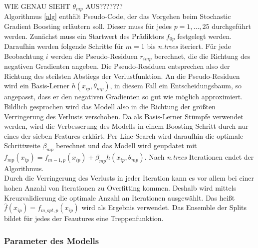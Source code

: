 WIE GENAU SIEHT $\theta_{mp}$ AUS???????\\
Algorithmus \ref{alg} enthält Pseudo-Code, der das Vorgehen beim Stochastic Gradient Boosting erläutern soll. Dieser muss für jedes $p=1,...,25$ durchgeführt werden. Zunächst muss ein Startwert des Prädiktors $f_{0p}$ festgelegt werden. Daraufhin werden folgende Schritte für $m=1$ bis \textit{n.trees} iteriert. Für jede Beobachtung $i$ werden die Pseudo-Residuen $r_{imp}$ berechnet, die die Richtung des negativen Gradienten angeben. Die Pseudo-Residuen entsprechen also der Richtung des steilsten Abstiegs der Verlustfunktion. An die Pseudo-Residuen wird ein Basis-Lerner $h(x_{ip},\theta_{mp})$, in diesem Fall ein Entscheidungsbaum, so angepasst, dass er den negativen Gradienten so gut wie möglich approximiert. Bildlich gesprochen wird das Modell also in die Richtung der größten Verringerung des Verlusts verschoben. Da als Basis-Lerner Stümpfe verwendet werden, wird die Verbesserung des Modells in einem Boosting-Schritt durch nur eines der sieben Features erklärt. Per Line-Search wird daraufhin die optimale Schrittweite $\beta_{mp}$ berechnet und das Modell wird geupdatet mit $f_{mp}(x_{ip}) = f_{m-1,p}(x_{ip}) + \beta_{mp} h(x_{ip},\theta_{mp})$. Nach \textit{n.trees} Iterationen endet der Algorithmus.\\
Durch die Verringerung des Verlusts in jeder Iteration kann es vor allem bei einer hohen Anzahl von Iterationen zu Overfitting kommen. Deshalb wird mittels Kreuzvalidierung die optimale Anzahl an Iterationen ausgewählt. Das heißt $\hat{f}(x_{ip}) = f_{m\_opt,p}(x_{ip})$ wird als Ergebnis verwendet. Das Ensemble der Splits bildet für jedes der Feautures eine Treppenfunktion.

\subsubsection*{Parameter des Modells}

